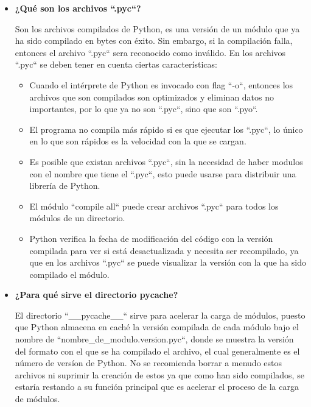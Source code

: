 \documentclass{article}
\begin{document}
\begin{itemize}
  \item \textbf{¿Qué son los archivos ``.pyc``?}
  
  Son los archivos compilados de Python, es una versión de un módulo que ya ha sido compilado en bytes con éxito. Sin embargo, si la compilación falla, entonces el archivo ``.pyc`` sera reconocido como inválido. En los archivos ``.pyc`` se deben tener en cuenta ciertas características:
  
  \begin{itemize}
    \item Cuando el intérprete de Python es invocado con flag ``-o``, entonces los archivos que son compilados son optimizados y eliminan datos no importantes, por lo que ya no son ``.pyc``, sino que son ``.pyo``.
    \item El programa no compila más rápido si es que ejecutar los ``.pyc``, lo único en lo que son rápidos es la velocidad con la que se cargan.
    \item Es posible que existan archivos ``.pyc``, sin la necesidad de haber modulos con el nombre que tiene el ``.pyc``, esto puede usarse para distribuir una librería de Python.
    \item El módulo ``compile all`` puede crear archivos ``.pyc`` para todos los módulos de un directorio.
    \item Python verifica la fecha de modificación del código con la versión compilada para ver si está desactualizada y necesita ser recompilado, ya que en los archivos ``.pyc`` se puede visualizar la versión con la que ha sido compilado el módulo.
  \end{itemize}

  \vspace{\baselineskip}

  \item \textbf{¿Para qué sirve el directorio pycache?}
  
  El directorio ``\_\_pycache\_\_`` sirve para acelerar la carga de módulos, puesto que Python almacena en caché la versión compilada de cada módulo bajo el nombre de ``nombre\_de\_modulo.version.pyc``, donde se muestra la versión del formato con el que se ha compilado el archivo, el cual generalmente es el número de versíon de Python. No se recomienda borrar a menudo estos archivos ni suprimir la creación de estos ya que como han sido compilados, se estaría restando a su función principal que es acelerar el proceso de la carga de módulos.


\end{itemize}
\end{document}
